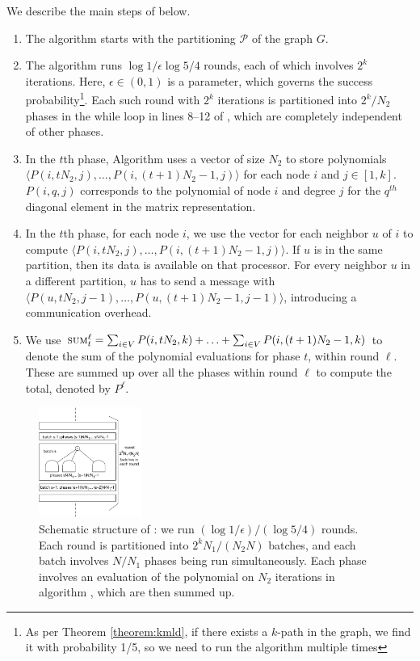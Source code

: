 We describe the main steps of \ouralgo{} below.
\begin{enumerate}
\item
The algorithm starts with the partitioning $\mathcal{P}$ of the graph $G$.
\item
The algorithm runs $\log{1/\epsilon}\log{5/4}$ rounds, each of which involves $2^k$ iterations.
Here, $\epsilon\in(0, 1)$ is a parameter, which governs the success probability\footnote{As per Theorem \ref{theorem:kmld}, if there exists a $k$-path in the graph, we find it with probability 1/5, so we need to run the algorithm multiple times}. Each such round with $2^k$ iterations is partitioned into
$2^k/N_2$ phases in the while loop in lines 8--12 of \ouralgo{}, which are completely independent of other phases.
\item
In the $t$th phase, Algorithm \parcircuitpath{} uses a vector of size $N_2$ to store polynomials
$\langle P(i, tN_2, j),\ldots, P(i, (t+1)N_2-1, j)\rangle$ for each node $i$ and $j \in [1,k]$. $P(i, q, j)$ corresponds to the polynomial of node $i$ and degree $j$ for the $q^{th}$ diagonal element in the matrix representation.
\item
In the $t$th phase, for each node $i$, we use the vector for each neighbor $u$ of $i$ to compute $\langle P(i, tN_2,j),\ldots, P(i, (t+1)N_2-1, j)\rangle$.
If $u$ is in the same partition, then its data is available on that processor. For every neighbor $u$ in a different partition, $u$ has to send a message with $\langle P(u, tN_2, j-1),\ldots, P(u, (t+1)N_2-1,j-1)\rangle$, introducing a communication overhead.
\item
We use $\textsc{sum}^{\ell}_t = \sum_{i\in V}P(i, tN_2, k) + \ldots + \sum_{i\in V} P(i, (t+1)N_2-1, k)$ 
to denote the sum of the polynomial evaluations for phase $t$, within round $\ell$. These are summed up over all the phases within round $\ell$ to compute the total, denoted by $P^{\ell}$.
\end{enumerate}

\begin{figure}[h]
\centering
\includegraphics[width=0.3\textwidth]{img/parallel.pdf}
\caption{
\small
Schematic structure of \ouralgo{}: we run $(\log{1/\epsilon})/(\log{5/4})$ rounds.
Each round is partitioned into $2^kN_1/(N_2N)$ batches, and each batch involves
$N/N_1$ phases being run simultaneously. Each phase involves an evaluation of the
polynomial on $N_2$ iterations in algorithm \parcircuit{}, which are then summed up.
}
\label{fig:parallel}
\end{figure}

